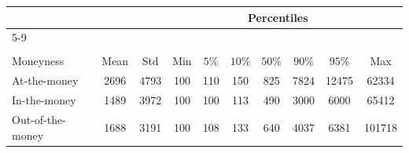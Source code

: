 \begin{center} 
 \begin{tabular*}{\textwidth}{@{\extracolsep{\fill}}lccccccccc} 
 \toprule 
 \multicolumn{4}{c}{} & \multicolumn{5}{c}{Percentiles} & \multicolumn{1}{c}{}\\ 
 \cline{5-9}\\ 
 \multicolumn{4}{c}{}\\ 
Moneyness & Mean & Std& Min &$5\%$& $10\%$& $50\%$ & $90\%$ & $95\%$& Max  \\ 
 \midrule 
At-the-money & 2696& 4793& 100& 110& 150& 825& 7824& 12475& 62334\\ 
In-the-money & 1489& 3972& 100& 100& 113& 490& 3000& 6000& 65412\\ 
Out-of-the-money& 1688& 3191& 100& 108& 133& 640& 4037& 6381& 101718\\ 
     \hline 
\bottomrule 
\end{tabular*} 
\end{center}